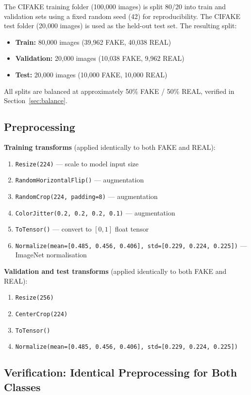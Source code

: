 \documentclass[12pt,a4paper]{article}
\begin{document}
The CIFAKE training folder (100,000 images) is split 80/20 into train and validation sets using a fixed random seed (42) for reproducibility. The CIFAKE test folder (20,000 images) is used as the held-out test set. The resulting split:
\begin{itemize}[noitemsep]
    \item \textbf{Train:} 80,000 images (39,962 FAKE, 40,038 REAL)
    \item \textbf{Validation:} 20,000 images (10,038 FAKE, 9,962 REAL)
    \item \textbf{Test:} 20,000 images (10,000 FAKE, 10,000 REAL)
\end{itemize}
All splits are balanced at approximately 50\% FAKE / 50\% REAL, verified in Section~\ref{sec:balance}.

\subsection{Preprocessing}

\textbf{Training transforms} (applied identically to both FAKE and REAL):
\begin{enumerate}[noitemsep]
    \item \texttt{Resize(224)} --- scale to model input size
    \item \texttt{RandomHorizontalFlip()} --- augmentation
    \item \texttt{RandomCrop(224, padding=8)} --- augmentation
    \item \texttt{ColorJitter(0.2, 0.2, 0.2, 0.1)} --- augmentation
    \item \texttt{ToTensor()} --- convert to $[0, 1]$ float tensor
    \item \texttt{Normalize(mean=[0.485, 0.456, 0.406], std=[0.229, 0.224, 0.225])} --- ImageNet normalisation
\end{enumerate}

\textbf{Validation and test transforms} (applied identically to both FAKE and REAL):
\begin{enumerate}[noitemsep]
    \item \texttt{Resize(256)}
    \item \texttt{CenterCrop(224)}
    \item \texttt{ToTensor()}
    \item \texttt{Normalize(mean=[0.485, 0.456, 0.406], std=[0.229, 0.224, 0.225])}
\end{enumerate}

\subsection{Verification: Identical Preprocessing for Both Classes}
\end{document}
